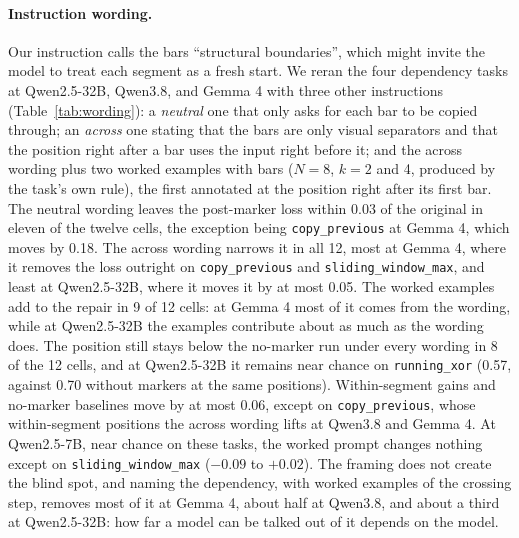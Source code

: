 \documentclass[10pt]{article} %
\newcommand{\task}[1]{\texttt{#1}}
\begin{document}
\paragraph{Instruction wording.} Our instruction calls the bars ``structural boundaries'', which might invite the model to treat each segment as a fresh start. We reran the four dependency tasks at Qwen2.5-32B, Qwen3.8, and Gemma 4 with three other instructions (Table~\ref{tab:wording}): a \emph{neutral} one that only asks for each bar to be copied through; an \emph{across} one stating that the bars are only visual separators and that the position right after a bar uses the input right before it; and the across wording plus two worked examples with bars ($N = 8$, $k = 2$ and 4, produced by the task's own rule), the first annotated at the position right after its first bar. The neutral wording leaves the post-marker loss within 0.03 of the original in eleven of the twelve cells, the exception being \task{copy\_previous} at Gemma 4, which moves by 0.18. The across wording narrows it in all 12, most at Gemma 4, where it removes the loss outright on \task{copy\_previous} and \task{sliding\_window\_max}, and least at Qwen2.5-32B, where it moves it by at most 0.05. The worked examples add to the repair in 9 of 12 cells: at Gemma 4 most of it comes from the wording, while at Qwen2.5-32B the examples contribute about as much as the wording does. The position still stays below the no-marker run under every wording in 8 of the 12 cells, and at Qwen2.5-32B it remains near chance on \task{running\_xor} (0.57, against 0.70 without markers at the same positions). Within-segment gains and no-marker baselines move by at most 0.06, except on \task{copy\_previous}, whose within-segment positions the across wording lifts at Qwen3.8 and Gemma 4. At Qwen2.5-7B, near chance on these tasks, the worked prompt changes nothing except on \task{sliding\_window\_max} ($-0.09$ to $+0.02$). The framing does not create the blind spot, and naming the dependency, with worked examples of the crossing step, removes most of it at Gemma 4, about half at Qwen3.8, and about a third at Qwen2.5-32B: how far a model can be talked out of it depends on the model.
\end{document}
